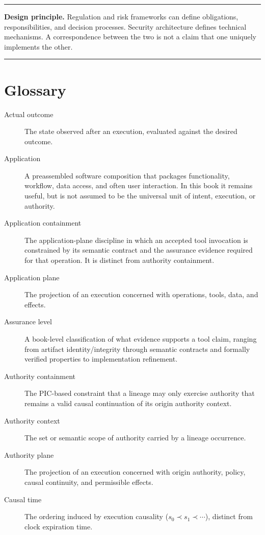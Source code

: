 \documentclass[10pt,oneside,openany]{book}
\newcommand{\principle}[1]{%
  \vspace{4pt}
  \noindent\begin{minipage}{\linewidth}
  \hrule\vspace{5pt}
  \small\sffamily\raggedright\textbf{Design principle.} #1
  \vspace{5pt}\hrule
  \end{minipage}\vspace{4pt}
}
\begin{document}
\principle{Regulation and risk frameworks can define obligations, responsibilities, and decision processes. Security architecture defines technical mechanisms. A correspondence between the two is not a claim that one uniquely implements the other.}

\clearpage

\backmatter

\chapter*{Glossary}

\begin{description}
\item[Actual outcome] The state observed after an execution, evaluated against the desired outcome.
\item[Application] A preassembled software composition that packages functionality, workflow, data access, and often user interaction. In this book it remains useful, but is not assumed to be the universal unit of intent, execution, or authority.
\item[Application containment] The application-plane discipline in which an accepted tool invocation is constrained by its semantic contract and the assurance evidence required for that operation. It is distinct from authority containment.
\item[Application plane] The projection of an execution concerned with operations, tools, data, and effects.
\item[Assurance level] A book-level classification of what evidence supports a tool claim, ranging from artifact identity/integrity through semantic contracts and formally verified properties to implementation refinement.
\item[Authority containment] The PIC-based constraint that a lineage may only exercise authority that remains a valid causal continuation of its origin authority context.
\item[Authority context] The set or semantic scope of authority carried by a lineage occurrence.
\item[Authority plane] The projection of an execution concerned with origin authority, policy, causal continuity, and permissible effects.
\item[Causal time] The ordering induced by execution causality ($s_0\prec s_1\prec\cdots$), distinct from clock expiration time.

\end{description}
\end{document}
